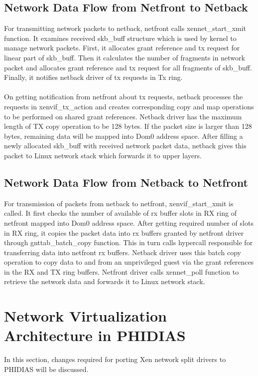 \subsection{Network Data Flow from Netfront to Netback \label{sec:tx}}
For transmitting network packets to netback, netfront calls xennet\_start\_xmit function. It examines received skb\_buff structure which is used by kernel to manage network packets. First, it allocates grant reference and tx request for linear part of skb\_buff. Then it calculates the number of fragments in network packet and allocates grant reference and tx request for all fragments of skb\_buff. Finally, it notifies netback driver of tx requests in Tx ring. 
\\
\\
On getting notification from netfront about tx requests, netback processes the requests in xenvif\_tx\_action and creates corresponding copy and map operations to be performed on shared grant references. Netback driver has the maximum length of TX copy operation to be 128 bytes. If the packet size is larger than 128 bytes, remaining data will be mapped into Dom0 address space. After filling a newly allocated skb\_buff with received network packet data, netback gives this packet to Linux network stack which forwards it to upper layers.

\subsection{Network Data Flow from Netback to Netfront \label{sec:rx}}
For transmission of packets from netback to netfront, xenvif\_start\_xmit is called. It first checks the number of available of rx buffer slots in RX ring of netfront mapped into Dom0 address space. After getting required number of slots in RX ring, it copies the packet data into rx buffers granted by netfront driver through gnttab\_batch\_copy function. This in turn calls hypercall responsible for transferring data into netfront rx buffers. Netback driver uses this batch copy operation to copy data to and from an unprivileged guest via the grant references in the RX and TX ring buffers. Netfront driver calls xennet\_poll function to retrieve the network data and forwards it to Linux network stack.

\section{Network Virtualization Architecture in PHIDIAS\label{sec:xennetphidias}}
In this section, changes required for porting Xen network split drivers to PHIDIAS will be discussed. 
